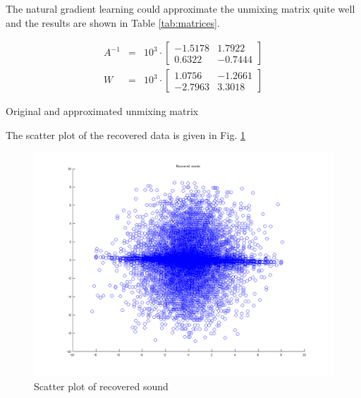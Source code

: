 \documentclass{article}
\begin{document}
		The natural gradient learning could approximate the unmixing matrix quite well and the results are shown in Table \ref{tab:matrices}.
		\begin{table}[H]
			\centering
			\begin{eqnarray*}
				A^{-1} &=&10^3\cdot\left [
				\begin{array}{cc}
				-1.5178 & 1.7922\\
    				0.6322  &  -0.7444
				\end{array}\right]\\
				W &=&10^3 \cdot \left[
				\begin{array}{cc}
				 1.0756  & -1.2661\\
   				-2.7963   & 3.3018
				\end{array} \right]
			\end{eqnarray*}
			\caption{Original and approximated unmixing matrix}
			\label{tab:matrices}
		\end{table}
		
		The scatter plot of the recovered data is given in Fig. \ref{fig:recSound}
		\begin{figure}[H]
			\centering
			\includegraphics[width=12cm]{recSound.png}
			\caption{Scatter plot of recovered sound}
			\label{fig:recSound}
		\end{figure}
		
\end{document}
